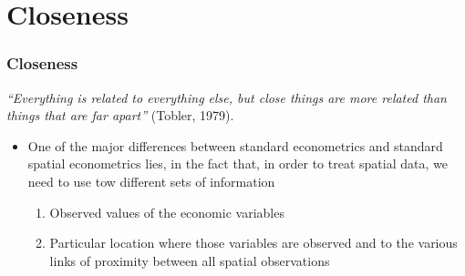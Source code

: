 \documentclass[
  shownotes,
  xcolor={svgnames},
  hyperref={colorlinks,citecolor=DarkBlue,linkcolor=DarkRed,urlcolor=DarkBlue}
  ]{beamer}
\begin{document}
\section{Closeness }
\begin{frame}[fragile]
\frametitle{Closeness}

 {\it “Everything is related to everything else, but close things are more related than things that are far apart”} (Tobler, 1979).

\bigskip

\begin{itemize}
  \item One of the major differences between standard econometrics and standard spatial econometrics lies, in the fact that, in order to treat spatial data, we need to use tow different sets of information
  \medskip
  \begin{enumerate}
  \item Observed values of the economic variables
  \medskip
  \item Particular location where those variables are observed and to the various links of proximity between all spatial observations
  \end{enumerate}
\end{itemize}

\end{frame}
\end{document}
